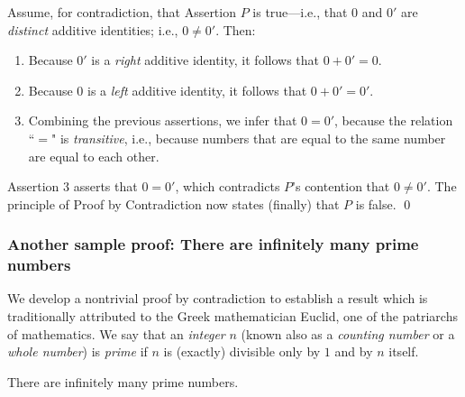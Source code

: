 \medskip

Assume, for contradiction, that Assertion $P$ is true---i.e., that $0$ and $0'$ are {\em distinct} additive identities; i.e., $0 \neq 0'$.  Then:
\begin{enumerate}
\item
Because $0'$ is a {\em right} additive identity, it follows that $0 + 0' = 0$.
\medskip\item
Because $0$ is a {\em left} additive identity, it follows that $0 + 0' = 0'$.
\medskip\item
Combining the previous assertions, we infer that $0 = 0'$, because the relation ``$=$" is {\em transitive}, i.e., because numbers that are equal to the same number are equal to each other.
\end{enumerate}
Assertion 3 asserts that $0 = 0'$, which contradicts $P$'s contention that $0 \neq 0'$.   The principle of Proof by Contradiction now states (finally) that $P$ is false. \qed

\subsubsection{Another sample proof: There are infinitely many prime numbers}
\label{sec:sample-contradictions}

 
We develop a nontrivial proof by contradiction to establish a result which is traditionally attributed to the Greek mathematician Euclid, one of the patriarchs of mathematics.  We say that an {\it integer} $n$ (known also as a {\it counting number} or a {\it whole number}) is {\it prime} if $n$ is (exactly) divisible only by $1$ and by $n$ itself.

\begin{prop}
\label{thm:Primes-infinite}
There are infinitely many prime numbers.
\end{prop}

